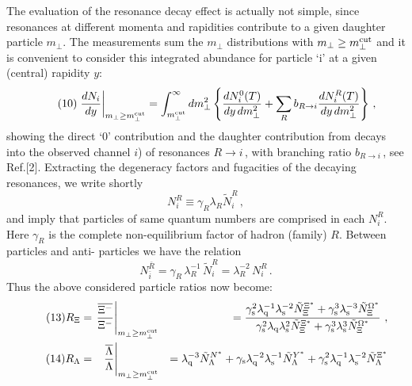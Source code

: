 \begin{mdframed}[linecolor=gray,roundcorner=12pt,backgroundcolor=Dandelion!15,linewidth=1pt,leftmargin=0cm,rightmargin=0cm,topline=true,bottomline=true,skipabove=12pt]
The evaluation of the resonance 
decay effect is actually not simple, since resonances at
different momenta and rapidities contribute to a given daughter 
particle $m_\bot$. The measurements sum 
the $m_\bot$ distributions with $m_\perp \geq m_\perp^{\rm cut}$
and it is convenient to consider this integrated abundance for
particle `i' at a given (central) rapidity $y$:
 \begin{equation}\tag{10}
 \left. {dN_i \over dy} \right\vert_{m_\perp \geq
     m_\perp^{\rm cut}}
 = \int_{m^{\rm cut}_\perp}^\infty dm_\perp^2
 \left\{ {dN_i^{0}(T) \over dy\, dm_\perp^2} +
 \sum_R b_{R\to i} {dN_i^R(T) \over dy\, dm_\perp^2} \right\}\, ,
\label{reso}
 \end{equation}
showing the direct `0' contribution and the daughter
contribution from decays into the observed channel $i$) 
of resonances $R\to i$\,, with branching ratio $b_{R\to i}$\,, see
Ref.[2]. Extracting the degeneracy factors
and fugacities of the decaying resonances, we write shortly 
\begin{equation}\tag{11}
 N^R_i \equiv \gamma_R \lambda_R \tilde N^R_i\,,
 \label{ntilde}
 \end{equation}
and imply that particles of same quantum numbers are comprised in
each $N^R_i$. Here $\gamma_R $ is the complete non-equilibrium
factor of hadron (family) $R$. Between particles and anti-
particles 
we have the relation
 \begin{equation}\tag{12}
N_{\bar i}^{\bar R} = \gamma_R\, \lambda_R^{-1}\, {\tilde N}_i^R 
  = \lambda_R^{-2}\, N_i^R \, .
 \label{ntildea}
 \end{equation}
Thus the above considered particle ratios now become:
 \begin{align}\tag{13}
 R_\Xi &= 
\left. {\overline{\Xi^-} \over \Xi^-}
\right\vert_{m_\perp\geq m_\perp^{\rm cut}}
  &= {\gamma_{\rm s}^2 \lambda_{\rm q}^{-1} 
\lambda_{\rm s}^{-2} 
 {\tilde N}_\Xi^{\Xi^*} +
  \gamma_{\rm s}^3 \lambda_{\rm s}^{-3}
  {\tilde N}_\Xi^{\Omega^*} \over
  \gamma_{\rm s}^2 \lambda_{\rm q} \lambda_{\rm s}^2 
 {\tilde N}_\Xi^{\Xi^*} +
  \gamma_{\rm s}^3 \lambda_{\rm s}^3
  {\tilde N}_\Xi^{\Omega^*} }\ ,
 \label{rxi}\\
\tag{14} R_\Lambda &= 
\left. \hphantom{^-}
  {\overline{\Lambda} \over \Lambda}
  \right\vert_{m_\perp\geq m_\perp^{\rm cut}}
&=
{  \lambda_{\rm q}^{-3}{\tilde N}_\Lambda^{N^*}+ 
\gamma_{\rm s} \lambda_{\rm q}^{-2} \lambda_{\rm s}^{-1}  
 {\tilde N}_\Lambda^{Y^*} +
 \gamma_{\rm s}^2 \lambda_{\rm q}^{-1} \lambda_{\rm s}^{-2} 
 {\tilde N}_\Lambda^{\Xi^*}
}
\end{align}
\end{mdframed}
